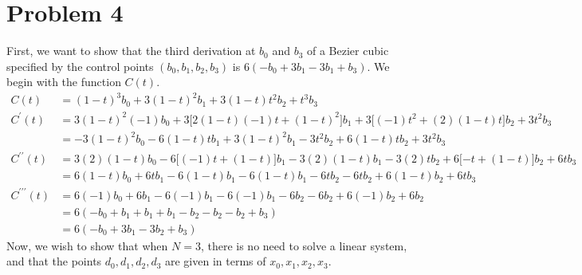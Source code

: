 \documentclass[paper=a4, fontsize=11pt]{scrartcl} %
\begin{document}
\section*{Problem 4}
First, we want to show that the third derivation at $b_0$ and $b_3$ of a Bezier
cubic specified by the control points $(b_0, b_1, b_2, b_3)$ is $6(-b_0 + 3b_1
-3b_1 + b_3)$. We begin with the function $C(t)$.
\begin{align*}
    C(t) &=
    (1 - t)^3b_0 + 3(1-t)^2b_1 +3(1-t)t^2b_2 + t^3b_3 \\
    C^\prime (t) &=
    3(1-t)^2 (-1) b_0 + 3 \lbrack 2(1-t)(-1)t + (1-t)^2 \rbrack b_1 + 3     \lbrack (-1)t^2 + (2)(1-t)t \rbrack b_2 + 3t^2 b_3 \\
    &=
    -3(1-t)^2b_0 -6(1-t)t b_1 + 3(1-t)^2b_1 -3t^2b_2 + 6(1-t)t b_2             +3t^2b_3 \\
    C^{\prime \prime}(t) &=
    3(2)(1-t)b_0 -6 \lbrack (-1)t + (1-t)\rbrack b_1 - 3(2)(1-t)b_1 -         3(2)t b_2 + 6 \lbrack -t + (1-t)\rbrack b_2 + 6t b_3 \\
    &=
    6(1-t)b_0 + 6t b_1 -6(1-t) b_1 -6(1-t) b_1-6t b_2 -6t b_2 +6(1-t)         b_2 + 6t b_3 \\
    C^{\prime  \prime \prime}(t) &=
    6(-1)b_0 + 6b_1 - 6(-1)b_1 -6(-1)b_1 - 6b_2 - 6 b_2 + 6(-1)b_2 +         6b_2 \\
    &=
    6(-b_0 + b_1 + b_1 + b_1 - b_2 - b_2 - b_2 + b_3) \\
    &=
    6(-b_0 +3 b_1 - 3b_2 + b_3)
\end{align*}
Now, we wish to show that when $N=3$, there is no need to solve a linear
system, and that the points $d_0, d_1, d_2, d_3$ are given in terms of $x_0,
x_1, x_2, x_3$.
\end{document}
